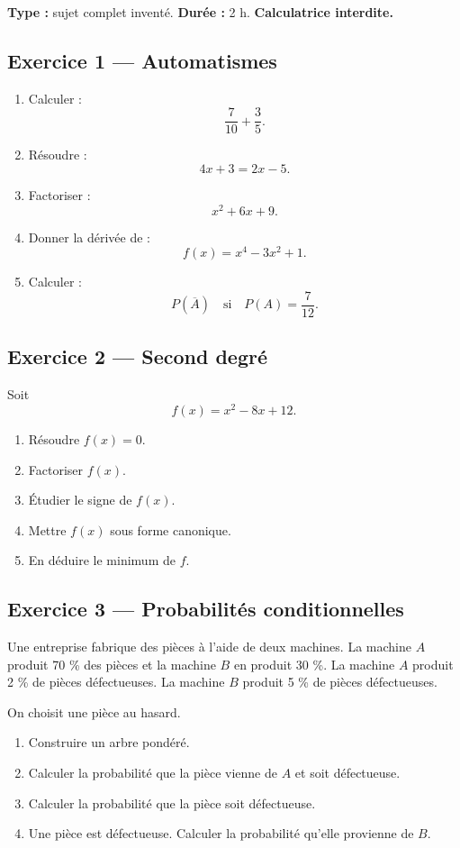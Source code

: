 \documentclass[11pt,a4paper]{article}
\begin{document}
\hypertarget{P-SUJET-10}{}
\begin{sujettype}
\textbf{Type :} sujet complet inventé.  
\textbf{Durée :} 2 h.  
\textbf{Calculatrice interdite.}

\subsection*{Exercice 1 — Automatismes}

\begin{enumerate}
  \item Calculer :
  \[
  \frac{7}{10}+\frac{3}{5}.
  \]
  \item Résoudre :
  \[
  4x+3=2x-5.
  \]
  \item Factoriser :
  \[
  x^2+6x+9.
  \]
  \item Donner la dérivée de :
  \[
  f(x)=x^4-3x^2+1.
  \]
  \item Calculer :
  \[
  P(\overline A)
  \quad\text{si}\quad
  P(A)=\frac{7}{12}.
  \]
\end{enumerate}

\subsection*{Exercice 2 — Second degré}

Soit
\[
f(x)=x^2-8x+12.
\]

\begin{enumerate}
  \item Résoudre $f(x)=0$.
  \item Factoriser $f(x)$.
  \item Étudier le signe de $f(x)$.
  \item Mettre $f(x)$ sous forme canonique.
  \item En déduire le minimum de $f$.
\end{enumerate}

\subsection*{Exercice 3 — Probabilités conditionnelles}

Une entreprise fabrique des pièces à l'aide de deux machines.  
La machine $A$ produit 70 \% des pièces et la machine $B$ en produit 30 \%.  
La machine $A$ produit 2 \% de pièces défectueuses.  
La machine $B$ produit 5 \% de pièces défectueuses.

On choisit une pièce au hasard.

\begin{enumerate}
  \item Construire un arbre pondéré.
  \item Calculer la probabilité que la pièce vienne de $A$ et soit défectueuse.
  \item Calculer la probabilité que la pièce soit défectueuse.
  \item Une pièce est défectueuse. Calculer la probabilité qu'elle provienne de $B$.
\end{enumerate}
\end{sujettype}
\end{document}
